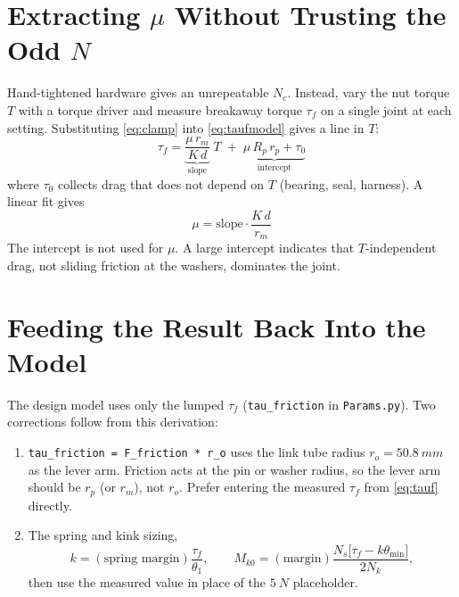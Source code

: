 \documentclass[11pt]{article}
\newcommand{\tauf}{\tau_f}
\newcommand{\Nc}{N_c}      %
\newcommand{\Rp}{R_p}      %
\begin{document}
\section{Extracting $\mu$ Without Trusting the Odd $N$}

Hand-tightened hardware gives an unrepeatable $\Nc$. Instead, vary the nut torque $T$ with a
torque driver and measure breakaway torque $\tauf$ on a single joint at each setting. Substituting
\eqref{eq:clamp} into \eqref{eq:taufmodel} gives a line in $T$:
\begin{equation}
\tauf = \underbrace{\frac{\mu\,r_m}{K\,d}}_{\text{slope}}\;T
\;+\;\underbrace{\mu\,\Rp\,r_p + \tau_{0}}_{\text{intercept}}
\label{eq:fit}
\end{equation}
where $\tau_0$ collects drag that does not depend on $T$ (bearing, seal, harness). A linear fit
gives
\begin{equation}
\boxed{\mu = \text{slope}\cdot\frac{K\,d}{r_m}}
\end{equation}
The intercept is not used for $\mu$. A large intercept indicates that $T$-independent drag, not
sliding friction at the washers, dominates the joint.

\section{Feeding the Result Back Into the Model}

The design model uses only the lumped $\tauf$ (\texttt{tau\_friction} in \texttt{Params.py}). Two
corrections follow from this derivation:
\begin{enumerate}[label=(\roman*)]
    \item \texttt{tau\_friction = F\_friction * r\_o} uses the link tube radius $r_o=\SI{50.8}{mm}$
    as the lever arm. Friction acts at the pin or washer radius, so the lever arm should be $r_p$
    (or $r_m$), not $r_o$. Prefer entering the measured $\tauf$ from \eqref{eq:tauf} directly.
    \item The spring and kink sizing,
    \begin{equation}
    k = (\text{spring margin})\frac{\tauf}{\theta_1},\qquad
    M_{k0} = (\text{margin})\frac{N_s\big[\tauf - k\theta_{\min}\big]}{2N_k},
    \end{equation}
    then use the measured value in place of the $\SI{5}{N}$ placeholder.
\end{enumerate}
\end{document}
